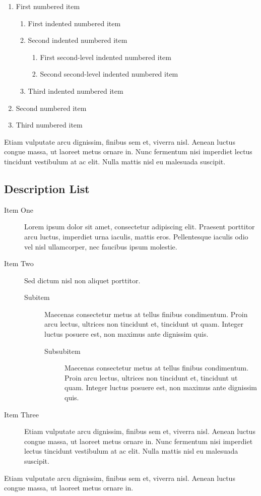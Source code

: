 \begin{fullwidth}
    \begin{enumerate}
        \item First numbered item
        \begin{enumerate}
            \item First indented numbered item
            \item Second indented numbered item
            \begin{enumerate}
                \item First second-level indented numbered item
                \item Second second-level indented numbered item
            \end{enumerate}
            \item Third indented numbered item
        \end{enumerate}
        \item Second numbered item
        \item Third numbered item
    \end{enumerate}

    Etiam vulputate arcu dignissim, finibus sem et, viverra nisl. Aenean luctus congue massa, ut laoreet metus ornare in. Nunc fermentum nisi imperdiet lectus tincidunt vestibulum at ac elit. Nulla mattis nisl eu malesuada suscipit.


    \subsection{Description List}

    \begin{description}
        \item[Item One] Lorem ipsum dolor sit amet, consectetur adipiscing elit. Praesent porttitor arcu luctus, imperdiet urna iaculis, mattis eros. Pellentesque iaculis odio vel nisl ullamcorper, nec faucibus ipsum molestie.
        \item[Item Two] Sed dictum nisl non aliquet porttitor.
        \begin{description}
            \item[Subitem] Maecenas consectetur metus at tellus finibus condimentum. Proin arcu lectus, ultrices non tincidunt et, tincidunt ut quam. Integer luctus posuere est, non maximus ante dignissim quis.
            \begin{description}
                \item[Subsubitem] Maecenas consectetur metus at tellus finibus condimentum. Proin arcu lectus, ultrices non tincidunt et, tincidunt ut quam. Integer luctus posuere est, non maximus ante dignissim quis.
            \end{description}
        \end{description}
        \item[Item Three] Etiam vulputate arcu dignissim, finibus sem et, viverra nisl. Aenean luctus congue massa, ut laoreet metus ornare in. Nunc fermentum nisi imperdiet lectus tincidunt vestibulum at ac elit. Nulla mattis nisl eu malesuada suscipit.
    \end{description}

    Etiam vulputate arcu dignissim, finibus sem et, viverra nisl. Aenean luctus congue massa, ut laoreet metus ornare in.
\end{fullwidth}
